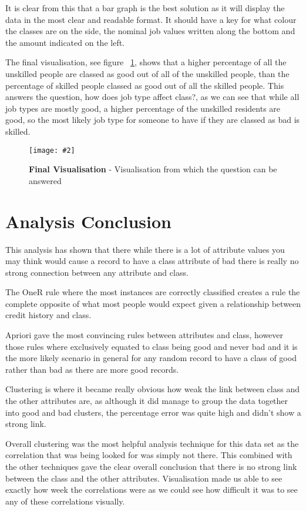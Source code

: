 \documentclass[12pt, a4paper]{article}
\newcommand{\figuremacro}[5]{
	\begin{figure}[#1]
		\centering
		\texttt{[image: \#2]}
		\caption[#3]{\textbf{#3}#4}
		\label{fig:#2}
	\end{figure}
}
\begin{document}
	It is clear from this that a bar graph is the best solution as it will display the data in the most clear and readable format. It should have a key for what colour the classes are on the side, the nominal job values written along the bottom and the amount indicated on the left.
	
	The final visualisation, see figure ~\ref{fig:final}, shows that a higher percentage of all the unskilled people are classed as good out of all of the unskilled people, than the percentage of skilled people classed as good out of all the skilled people. This answers the question, how does job type affect class?, as we can see that while all job types are mostly good, a higher percentage of the unskilled residents are good, so the most likely job type for someone to have if they are classed as bad is skilled.
	
	\figuremacro{h}{final}{Final Visualisation}{ - Visualisation from which the question can be answered}{1.0}
	
	
	\section{Analysis Conclusion}
	This analysis has shown that there while there is a lot of attribute values you may think would cause a record to have a class attribute of bad there is really no strong connection between any attribute and class. 
	
	The OneR rule where the most instances are correctly classified creates a rule the complete opposite of what most people would expect given a relationship between credit history and class. 
	
	Apriori gave the most convincing rules between attributes and class, however those rules where exclusively equated to class being good and never bad and it is the more likely scenario in general for any random record to have a class of good rather than bad as there are more good records.
	
	Clustering is where it became really obvious how weak the link between class and the other attributes are, as although it did manage to group the data together into good and bad clusters, the percentage error was quite high and didn't show a strong link.
	
	Overall clustering was the most helpful analysis technique for this data set as the correlation that was being looked for was simply not there. This combined with the other techniques gave the clear overall conclusion that there is no strong link between the class and the other attributes. Visualisation made us able to see exactly how week the correlations were as we could see how difficult it was to see any of these correlations visually.
	
	
\end{document}
